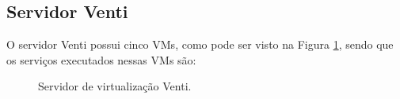 \subsection{Servidor Venti}
\label{section:serv_venti}

O servidor Venti possui cinco \ac{VM}s, como pode ser visto na Figura \ref{fig:servidor_venti}, sendo que os serviços executados nessas \ac{VM}s
são:

\begin{figure}[h!]
 \centering
 \caption{Servidor de virtualização Venti.}
 \label{fig:servidor_venti}
\end{figure}

